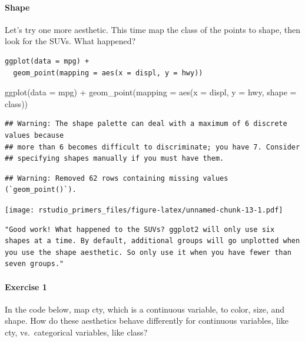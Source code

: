 \documentclass[
]{article}
\newenvironment{Shaded}{\begin{snugshade}}{\end{snugshade}}
\newcommand{\AttributeTok}[1]{\textcolor[rgb]{0.77,0.63,0.00}{#1}}
\newcommand{\FunctionTok}[1]{\textcolor[rgb]{0.00,0.00,0.00}{#1}}
\newcommand{\NormalTok}[1]{#1}
\newcommand{\SpecialCharTok}[1]{\textcolor[rgb]{0.00,0.00,0.00}{#1}}
\begin{document}
\hypertarget{shape}{%
\paragraph{Shape}\label{shape}}

Let's try one more aesthetic. This time map the class of the points to
shape, then look for the SUVs. What happened?

\begin{verbatim}
ggplot(data = mpg) + 
  geom_point(mapping = aes(x = displ, y = hwy))
\end{verbatim}

\begin{Shaded}
\begin{Highlighting}[]
\FunctionTok{ggplot}\NormalTok{(}\AttributeTok{data =}\NormalTok{ mpg) }\SpecialCharTok{+} 
  \FunctionTok{geom\_point}\NormalTok{(}\AttributeTok{mapping =} \FunctionTok{aes}\NormalTok{(}\AttributeTok{x =}\NormalTok{ displ, }\AttributeTok{y =}\NormalTok{ hwy, }\AttributeTok{shape =}\NormalTok{ class))}
\end{Highlighting}
\end{Shaded}

\begin{verbatim}
## Warning: The shape palette can deal with a maximum of 6 discrete values because
## more than 6 becomes difficult to discriminate; you have 7. Consider
## specifying shapes manually if you must have them.
\end{verbatim}

\begin{verbatim}
## Warning: Removed 62 rows containing missing values (`geom_point()`).
\end{verbatim}

\texttt{[image: rstudio\_primers\_files/figure-latex/unnamed-chunk-13-1.pdf]}

\begin{verbatim}
"Good work! What happened to the SUVs? ggplot2 will only use six shapes at a time. By default, additional groups will go unplotted when you use the shape aesthetic. So only use it when you have fewer than seven groups."
\end{verbatim}

\hypertarget{exercise-1-1}{%
\paragraph{Exercise 1}\label{exercise-1-1}}

In the code below, map cty, which is a continuous variable, to color,
size, and shape. How do these aesthetics behave differently for
continuous variables, like cty, vs.~categorical variables, like class?
\end{document}
